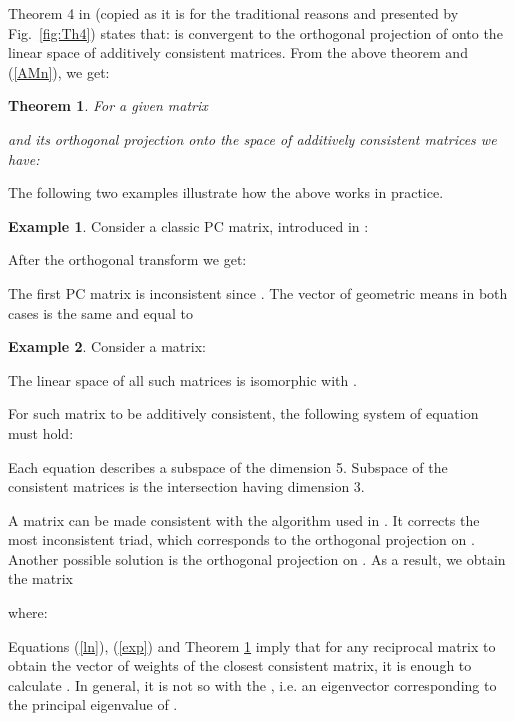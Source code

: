 \documentclass [12pt]{article}
\newtheorem{thm}{\bf Theorem}
\theoremstyle{definition}
\newtheorem{ex}{\bf Example}
\begin{document}
Theorem 4 in \cite{HK1996} (copied as it is for the traditional reasons and presented by Fig.~\ref{fig:Th4})
states that:  is convergent to the orthogonal projection of  onto the linear space of additively consistent matrices. From the above theorem and (\ref{AMn}), we get:

\begin{thm} \label{AM}
For a given matrix

and its orthogonal projection  onto the space of additively consistent matrices we have:

\end{thm}

The following two examples illustrate how the above works in practice.

\begin{ex}
Consider a classic PC matrix, introduced in \cite{Kocz93}:



After the orthogonal transform we get:




The first PC matrix is inconsistent since . The vector of geometric means in both cases is the same and equal to 



\end{ex}

\begin{ex}

Consider a matrix:



The linear space of all such matrices is isomorphic with .

For such matrix to be additively consistent,
the following system of equation must hold:






Each equation describes a subspace  of the dimension 5. Subspace  of the consistent matrices is the intersection having dimension 3.

A matrix can be made consistent with the algorithm used in \cite{HK1996}. It corrects the most inconsistent triad, which corresponds to the orthogonal projection on .
Another possible solution is the orthogonal projection on . As a result, we obtain the matrix



where:

\end{ex}


Equations (\ref{ln}), (\ref{exp}) and Theorem \ref{AM} imply that for any reciprocal matrix  to obtain the vector of weights of the closest consistent matrix, it is enough to calculate .
In general, it is not so with the , i.e. an eigenvector corresponding to the principal eigenvalue of .
\end{document}
